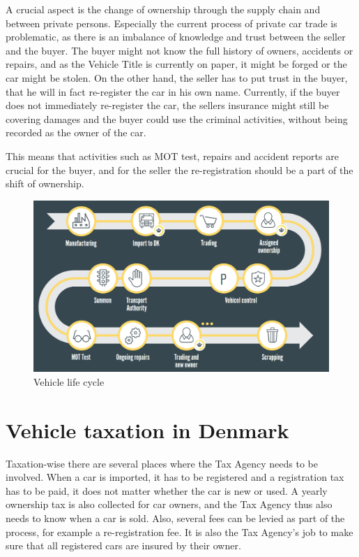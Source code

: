 \documentclass[oneside,a4paper,10pts,article]{memoir}
\begin{document}
A crucial aspect is the change of ownership through the supply chain
and between private persons. Especially the current process of private
car trade is problematic, as there is an imbalance of knowledge and
trust between the seller and the buyer. The buyer might not know the
full history of owners, accidents or repairs, and as the Vehicle Title
is currently on paper, it might be forged or the car might be
stolen. On the other hand, the seller has to put trust in the buyer,
that he will in fact re-register the car in his own name. Currently,
if the buyer does not immediately re-register the car, the sellers
insurance might still be covering damages and the buyer could use the
criminal activities, without being recorded as the owner of the car.

This means that activities such as MOT test, repairs and accident
reports are crucial for the buyer, and for the seller the
re-registration should be a part of the shift of ownership.

\begin{figure} %
  \centering
  \includegraphics[width=\textwidth]{lifecycle.png}
  \caption{Vehicle life cycle}
  \label{fig:lifecycle}
\end{figure}

\section{Vehicle taxation in Denmark}
Taxation-wise there are several places where the Tax Agency needs to
be involved. When a car is imported, it has to be registered and a
registration tax has to be paid, it does not matter whether the car is
new or used. A yearly ownership tax is also collected for car owners,
and the Tax Agency thus also needs to know when a car is sold. Also,
several fees can be levied as part of the process, for example a
re-registration fee. It is also the Tax Agency's job to make sure that
all registered cars are insured by their owner.
\end{document}
